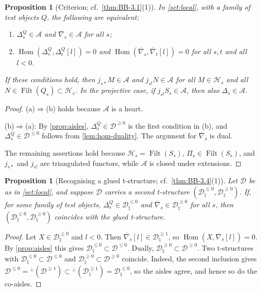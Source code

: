 \documentclass[11pt,reqno]{amsart}
\theoremstyle{plain}
\newtheorem{proposition}[theorem]{Proposition}
\theoremstyle{definition}
\theoremstyle{remark}
\DeclareMathOperator{\Hom}{Hom}
\DeclareMathOperator{\Filt}{Filt}
\newcommand{\nablabar}{\overline{\nabla}}
\newcommand{\cD}{\mathcal{D}}
\newcommand{\cA}{\mathcal{A}}
\newcommand{\cH}{\mathcal{H}}
\begin{document}
\begin{proposition}[Criterion; cf.\ {\cref{thm:BB-3.1}(1)}]\label{prop:criterion}
In \cref{set:local}, with a family of test objects $Q$, the following are equivalent:
\begin{enumerate}
\item[(a)] $\Delta^Q_s\in\cA$ and $\nablabar_s\in\cA$ for all $s$;
\item[(b)] $\Hom(\Delta^Q_s,\Delta^Q_t[l])=0$ and $\Hom(\nablabar_s,\nablabar_t[l])=0$ for all $s,t$ and all $l<0$.
\end{enumerate}
If these conditions hold, then $j_{s*}M\in\cA$ and $j_{s!}N\in\cA$ for all $M\in\cH_s$ and all $N\in\Filt(Q_s)\subset\cH_s$. In the projective case, if $j_{s!}S_s\in\cA$, then also $\Delta_s\in\cA$.
\end{proposition}

\begin{proof}
(a)$\Rightarrow$(b) holds because $\cA$ is a heart.

(b)$\Rightarrow$(a): By \cref{prop:aisles}, $\Delta^Q_s\in\cD^{\ge0}$ is the first condition in (b), and $\Delta^Q_s\in\cD^{\le0}$ follows from \cref{lem:hom-duality}. The argument for $\nablabar_s$ is dual.

The remaining assertions hold because $\cH_s=\Filt(S_s)$, $\Pi_s\in\Filt(S_s)$, and $j_{s*}$ and $j_{s!}$ are triangulated functors, while $\cA$ is closed under extensions.
\end{proof}

\begin{proposition}[Recognising a glued t-structure; cf.\ {\cref{thm:BB-3.4}(1)}]\label{prop:recognise}
Let $\cD$ be as in \cref{set:local}, and suppose $\cD$ carries a second t-structure $(\cD_\natural^{\le0},\cD_\natural^{\ge0})$. If, for some family of test objects, $\Delta^Q_s\in\cD_\natural^{\le0}$ and $\nablabar_s\in\cD_\natural^{\ge0}$ for all $s$, then $(\cD_\natural^{\le0},\cD_\natural^{\ge0})$ coincides with the glued t-structure.
\end{proposition}

\begin{proof}
Let $X\in\cD_\natural^{\le0}$ and $l<0$. Then $\nablabar_s[l]\in\cD_\natural^{\ge1}$, so $\Hom(X,\nablabar_s[l])=0$. By \cref{prop:aisles} this gives $\cD_\natural^{\le0}\subset\cD^{\le0}$. Dually, $\cD_\natural^{\ge0}\subset\cD^{\ge0}$. Two t-structures with $\cD_\natural^{\le0}\subset\cD^{\le0}$ and $\cD_\natural^{\ge0}\subset\cD^{\ge0}$ coincide. Indeed, the second inclusion gives $\cD^{\le0}={}^\perp(\cD^{\ge1})\subset{}^\perp(\cD_\natural^{\ge1})=\cD_\natural^{\le0}$, so the aisles agree, and hence so do the co-aisles.
\end{proof}
\end{document}
